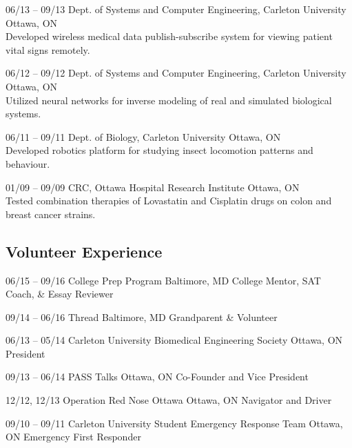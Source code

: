 \documentclass[]{friggeri-cv} %
\begin{document}
\begin{entrylist}
\entry
{06/13 -- 09/13}
{Dept. of Systems and Computer Engineering, Carleton University}
{Ottawa, ON}
{\\
Developed wireless medical data publish-subscribe system for viewing patient vital signs remotely.}

\entry
{06/12 -- 09/12}
{Dept. of Systems and Computer Engineering, Carleton University}
{Ottawa, ON}
{\\
Utilized neural networks for inverse modeling of real and simulated biological systems.}

\entry
{06/11 -- 09/11}
{Dept. of Biology, Carleton University}
{Ottawa, ON}
{\\
Developed robotics platform for studying insect locomotion patterns and behaviour.}

\entry
{01/09 -- 09/09}
{CRC, Ottawa Hospital Research Institute}
{Ottawa, ON}
{\\
Tested combination therapies of Lovastatin and Cisplatin drugs on colon and breast cancer strains.}
\end{entrylist}

\subsection{Volunteer Experience}

\begin{entrylist}
\entry
{06/15 -- 09/16}
{College Prep Program}
{Baltimore, MD}
{College Mentor, SAT Coach, \& Essay Reviewer}

\entry
{09/14 -- 06/16}
{Thread}
{Baltimore, MD}
{Grandparent \& Volunteer}

\entry
{06/13 -- 05/14}
{Carleton University Biomedical Engineering Society}
{Ottawa, ON}
{President}

\entry
{09/13 -- 06/14}
{PASS Talks}
{Ottawa, ON}
{Co-Founder and Vice President}

\entry
{12/12, 12/13}
{Operation Red Nose Ottawa}
{Ottawa, ON}
{Navigator and Driver}

\entry
{09/10 -- 09/11}
{Carleton University Student Emergency Response Team}
{Ottawa, ON}
{Emergency First Responder}
\end{entrylist}

\end{document}

